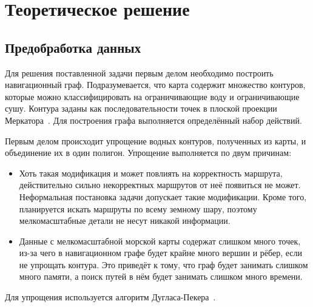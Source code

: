 \chapter{Теоретическое решение}

\label{ch:theoretical-solution}

\section{Предобработка данных}

\label{sec:preprocessing}

Для решения поставленной задачи первым делом необходимо построить
навигационный граф. Подразумевается, что карта содержит множество
контуров, которые можно классифицировать на ограничивающие воду и
ограничивающие сушу. Контура заданы как последовательности точек в
плоской проекции Меркатора~\cite{thomas1952conformal}. Для построения
графа выполняется определённый набор действий.

Первым делом происходит упрощение водных контуров, полученных из карты, и
объединение их в один полигон. Упрощение выполняется по двум причинам:
\begin{itemize}
    \item Хоть такая модификация и может повлиять на корректность
      маршрута, действительно сильно некорректных маршрутов от неё
      появиться не может. Неформальная постановка задачи допускает
      такие модификации. Кроме того, планируется искать маршруты по
      всему земному шару, поэтому мелкомасштабные детали не несут
      никакой информации.
    \item Данные с мелкомасштабной морской карты содержат слишком
      много точек, из-за чего в навигационном графе будет крайне много
      вершин и рёбер, если не упрощать контура. Это приведёт к тому,
      что граф будет занимать слишком много памяти, а поиск путей в
      нём будет занимать слишком много времени.
\end{itemize}
Для упрощения используется алгоритм Дугласа-Пекера~\cite{douglas1973algorithms}.

